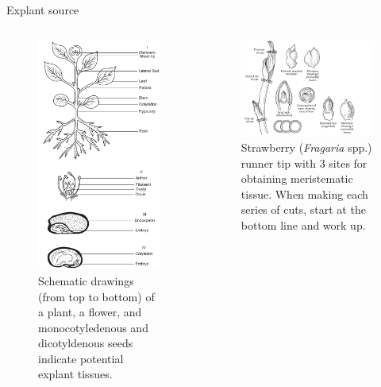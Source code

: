 \documentclass[
  ignorenonframetext,
  aspectratio=169]{beamer}
\begin{document}
\begin{frame}{Explant source}
\protect\hypertarget{explant-source}{}
\begin{columns}[T,onlytextwidth]


\begin{figure}
\includegraphics[width=0.45\linewidth]{../images/explant_sources} \caption{Schematic drawings (from top to bottom) of a plant, a flower, and monocotyledenous and dicotyldenous seeds indicate potential explant tissues.}\label{fig:explant-source}
\end{figure}


\begin{figure}
\includegraphics[width=0.9\linewidth]{../images/strawberry-meristem-generation} \caption{Strawberry (\textit{Fragaria} spp.) runner tip with 3 sites for obtaining meristematic tissue. When making each series of cuts, start at the bottom line and work up.}\label{fig:explant-source-strawberry}
\end{figure}

\end{columns}
\end{frame}
\end{document}
